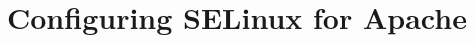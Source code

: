 
\usepackage{minted}
\usepackage{booktabs}


	
	
	
	
	\section{Configuring SELinux for Apache}
		 



